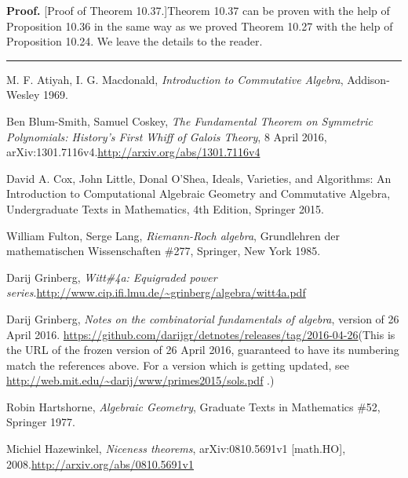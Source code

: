 \documentclass[numbers=enddot,12pt,final,onecolumn,notitlepage]{scrartcl}%
\newenvironment{proof}[1][Proof]{\noindent\textbf{#1.} }{\ \rule{0.5em}{0.5em}}
\begin{document}
\begin{proof}
[Proof of Theorem 10.37.]Theorem 10.37 can be proven with the help of
Proposition 10.36 in the same way as we proved Theorem 10.27 with the help of
Proposition 10.24. We leave the details to the reader.
\end{proof}

\begin{thebibliography}{999999999}                                                                                        %


M. F. Atiyah, I. G. Macdonald,
\textit{Introduction to Commutative Algebra}, Addison-Wesley 1969.

Ben Blum-Smith, Samuel Coskey, \textit{The
Fundamental Theorem on Symmetric Polynomials: History's First Whiff of Galois
Theory}, 8 April 2016, arXiv:1301.7116v4.\newline\url{http://arxiv.org/abs/1301.7116v4}

David A. Cox, John Little, Donal O'Shea, Ideals,
Varieties, and Algorithms: An Introduction to Computational Algebraic Geometry
and Commutative Algebra, Undergraduate Texts in Mathematics, 4th Edition,
Springer 2015.

William Fulton, Serge Lang, \textit{Riemann-Roch
algebra}, Grundlehren der mathematischen Wissenschaften \#277, Springer, New
York 1985.

Darij Grinberg, \textit{Witt\#4a: Equigraded power
series}.\newline\url{http://www.cip.ifi.lmu.de/~grinberg/algebra/witt4a.pdf}

Darij Grinberg, \textit{Notes on the
combinatorial fundamentals of algebra}, version of 26 April 2016.\newline%
\url{https://github.com/darijgr/detnotes/releases/tag/2016-04-26}\newline(This
is the URL of the frozen version of 26 April 2016, guaranteed to have its
numbering match the references above. For a version which is getting updated,
see \url{http://web.mit.edu/~darij/www/primes2015/sols.pdf} .)

Robin Hartshorne, \textit{Algebraic Geometry},
Graduate Texts in Mathematics \#52, Springer 1977.

Michiel Hazewinkel, \textit{Niceness theorems},
arXiv:0810.5691v1 [math.HO], 2008.\newline\url{http://arxiv.org/abs/0810.5691v1}


\end{thebibliography}
\end{document}
